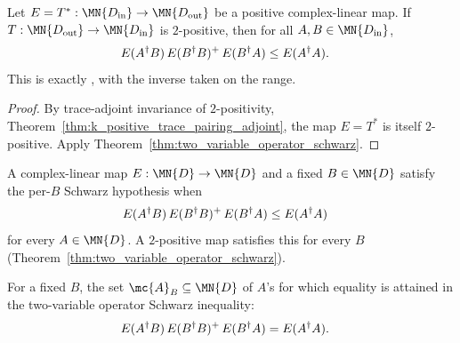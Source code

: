 \begin{theorem}
    \label{thm:wolf_two_variable_operator_schwarz}
    \leanok
    Let $E=T^*:\MN{D_{\rm in}}\to\MN{D_{\rm out}}$ be a positive
    complex-linear map. If
    $T:\MN{D_{\rm out}}\to\MN{D_{\rm in}}$ is $2$-positive, then for all
    $A,B\in\MN{D_{\rm in}}$,
    \begin{align}
        E(A^\dagger B)\,E(B^\dagger B)^{+}\,E(B^\dagger A)
         & \le E(A^\dagger A).
        \notag
    \end{align}
    This is exactly \cite[Theorem~5.3 and Eq.~(5.4)]{Wolf2012Quantum}, with
    the inverse taken on the range.
\end{theorem}

\begin{proof}\leanok
    By trace-adjoint invariance of $2$-positivity,
    Theorem~\ref{thm:k_positive_trace_pairing_adjoint}, the map $E=T^*$ is
    itself $2$-positive. Apply
    Theorem~\ref{thm:two_variable_operator_schwarz}.
\end{proof}

\begin{definition}\label{def:has_schwarz_inequality_for}
    \leanok
    A complex-linear map $E:\MN{D}\to\MN{D}$ and a fixed $B\in\MN{D}$
    satisfy the per-$B$ Schwarz hypothesis when
    \begin{align}
        E(A^\dagger B)\,E(B^\dagger B)^{+}\,E(B^\dagger A)
         & \le E(A^\dagger A)
        \notag
    \end{align}
    for every $A\in\MN{D}$. A $2$-positive map satisfies this for every
    $B$ (Theorem~\ref{thm:two_variable_operator_schwarz}).
\end{definition}

\begin{definition}\label{def:equality_attaining}
    \leanok
    For a fixed $B$, the set $\mc{A}_B\subseteq\MN{D}$ of $A$'s for which
    equality is attained in the two-variable operator Schwarz inequality:
    \begin{align}
        E(A^\dagger B)\,E(B^\dagger B)^{+}\,E(B^\dagger A)
         & = E(A^\dagger A).
        \notag
    \end{align}
\end{definition}

